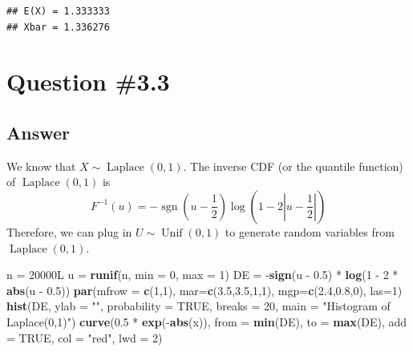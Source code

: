 \documentclass[11pt,]{article}
\newenvironment{Shaded}{\begin{snugshade}}{\end{snugshade}}
\newcommand{\KeywordTok}[1]{\textcolor[rgb]{0.13,0.29,0.53}{\textbf{{#1}}}}
\newcommand{\DataTypeTok}[1]{\textcolor[rgb]{0.13,0.29,0.53}{{#1}}}
\newcommand{\DecValTok}[1]{\textcolor[rgb]{0.00,0.00,0.81}{{#1}}}
\newcommand{\FloatTok}[1]{\textcolor[rgb]{0.00,0.00,0.81}{{#1}}}
\newcommand{\StringTok}[1]{\textcolor[rgb]{0.31,0.60,0.02}{{#1}}}
\newcommand{\OtherTok}[1]{\textcolor[rgb]{0.56,0.35,0.01}{{#1}}}
\newcommand{\NormalTok}[1]{{#1}}
\begin{document}
\begin{verbatim}
## E(X) = 1.333333
## Xbar = 1.336276
\end{verbatim}

\section{Question \#3.3}\label{question-3.3}

\subsection{Answer}\label{answer-2}

We know that \(X \sim \operatorname{Laplace}(0,1)\). The inverse CDF (or
the quantile function) of \(\operatorname{Laplace}(0,1)\) is \[
F^{-1}(u) = -\operatorname{sgn}\left(u-\dfrac{1}{2}\right)\log\left(1-2\left|u-\dfrac{1}{2}\right|\right)
\] Therefore, we can plug in \(U\sim \operatorname{Unif}(0,1)\) to
generate random variables from \(\operatorname{Laplace}(0,1)\).

\begin{Shaded}
\begin{Highlighting}[]
\NormalTok{n =}\StringTok{ }\NormalTok{20000L}
\NormalTok{u =}\StringTok{ }\KeywordTok{runif}\NormalTok{(n, }\DataTypeTok{min =} \DecValTok{0}\NormalTok{, }\DataTypeTok{max =} \DecValTok{1}\NormalTok{)}
\NormalTok{DE =}\StringTok{ }\NormalTok{-}\KeywordTok{sign}\NormalTok{(u -}\StringTok{ }\FloatTok{0.5}\NormalTok{) *}\StringTok{ }\KeywordTok{log}\NormalTok{(}\DecValTok{1} \NormalTok{-}\StringTok{ }\DecValTok{2} \NormalTok{*}\StringTok{ }\KeywordTok{abs}\NormalTok{(u -}\StringTok{ }\FloatTok{0.5}\NormalTok{))}
\KeywordTok{par}\NormalTok{(}\DataTypeTok{mfrow =} \KeywordTok{c}\NormalTok{(}\DecValTok{1}\NormalTok{,}\DecValTok{1}\NormalTok{), }\DataTypeTok{mar=}\KeywordTok{c}\NormalTok{(}\FloatTok{3.5}\NormalTok{,}\FloatTok{3.5}\NormalTok{,}\DecValTok{1}\NormalTok{,}\DecValTok{1}\NormalTok{), }\DataTypeTok{mgp=}\KeywordTok{c}\NormalTok{(}\FloatTok{2.4}\NormalTok{,}\FloatTok{0.8}\NormalTok{,}\DecValTok{0}\NormalTok{), }\DataTypeTok{las=}\DecValTok{1}\NormalTok{)}
\KeywordTok{hist}\NormalTok{(DE, }\DataTypeTok{ylab =} \StringTok{""}\NormalTok{, }\DataTypeTok{probability =} \OtherTok{TRUE}\NormalTok{, }\DataTypeTok{breaks =} \DecValTok{20}\NormalTok{,}
     \DataTypeTok{main =} \StringTok{"Histogram of Laplace(0,1)"}\NormalTok{)}
\KeywordTok{curve}\NormalTok{(}\FloatTok{0.5} \NormalTok{*}\StringTok{ }\KeywordTok{exp}\NormalTok{(-}\KeywordTok{abs}\NormalTok{(x)), }\DataTypeTok{from =} \KeywordTok{min}\NormalTok{(DE), }\DataTypeTok{to =} \KeywordTok{max}\NormalTok{(DE), }\DataTypeTok{add =} \OtherTok{TRUE}\NormalTok{, }\DataTypeTok{col =} \StringTok{"red"}\NormalTok{, }\DataTypeTok{lwd =} \DecValTok{2}\NormalTok{)}
\end{Highlighting}
\end{Shaded}
\end{document}
